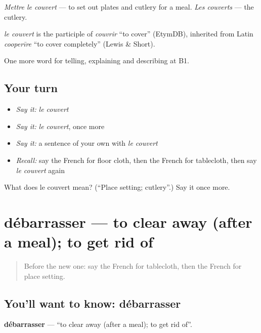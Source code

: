 \emph{Mettre le couvert} — to set out plates and cutlery for a meal. \emph{Les couverts} — the cutlery.

\begin{cousinweb}
\emph{le couvert} is the participle of \emph{couvrir} \textquotedblleft{}to cover\textquotedblright{} (EtymDB), inherited from Latin \emph{cooperīre} \textquotedblleft{}to cover completely\textquotedblright{} (Lewis \& Short).
\end{cousinweb}

\begin{grammarlens}[title={What you've built}]
One more word for telling, explaining and describing at B1.
\end{grammarlens}

\subsection*{Your turn}
\begin{itemize}
\raggedright
  \item \emph{Say it:} \emph{le couvert}
  \item \emph{Say it:} \emph{le couvert}, once more
  \item \emph{Say it:} a sentence of your own with \emph{le couvert}
  \item \emph{Recall:} say the French for floor cloth, then the French for tablecloth, then say \emph{le couvert} again
\end{itemize}

\begin{tcolorbox}[breakable,colback=teal!4,colframe=teal!35!black,title={Before you move on}]
What does le couvert mean? (\textquotedblleft{}Place setting; cutlery\textquotedblright{}.) Say it once more.
\end{tcolorbox}
\section[débarrasser]{débarrasser — to clear away (after a meal); to get rid of}

\label{lesson:FR-C529-debarrasser}



\begin{quote}
Before the new one: say the French for tablecloth, then the French for place setting.
\end{quote}

\subsection*{You'll want to know: débarrasser}
\textbf{débarrasser} — \textquotedblleft{}to clear away (after a meal); to get rid of\textquotedblright{}.

